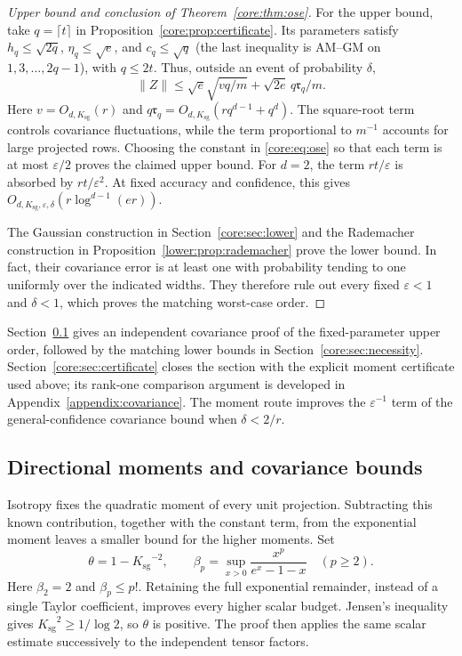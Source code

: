 \documentclass[11pt,a4paper]{article}
\theoremstyle{definition}\newtheorem{definition}[theorem]{Definition}
\theoremstyle{remark}\newtheorem{remark}[theorem]{Remark}
\numberwithin{equation}{section}
\newcommand{\Ksg}{{K_{\mathrm{sg}}}}\newcommand{\Cfour}{{C_4}}
\newcommand{\Rmom}{\mathfrak r}
\newcommand{\norm}[1]{\lVert#1\rVert}\newcommand{\ip}[2]{\langle#1,#2\rangle}
\begin{document}
\begin{proof}[Upper bound and conclusion of Theorem~\ref{core:thm:ose}]
For the upper bound, take $q=\lceil t\rceil$ in
Proposition~\ref{core:prop:certificate}. Its parameters satisfy
$h_q\le\sqrt{2q}$, $\eta_q\le\sqrt e$, and $c_q\le\sqrt q$
(the last inequality is AM--GM on $1,3,\ldots,2q-1$), with $q\le2t$.
Thus, outside an event of probability $\delta$,
\[
 \norm Z\le\sqrt e\sqrt{vq/m}+\sqrt{2e}\,q\Rmom_q/m.
\]
Here $v=O_{d,\Ksg}(r)$ and
$q\Rmom_q=O_{d,\Ksg}(rq^{d-1}+q^d)$.
The square-root term controls covariance fluctuations, while the term
proportional to $m^{-1}$ accounts for large projected rows.
Choosing the constant in \eqref{core:eq:ose} so that each term is at
most $\varepsilon/2$ proves the claimed upper bound. For $d=2$, the
term $rt/\varepsilon$ is absorbed by $rt/\varepsilon^2$.
At fixed accuracy and confidence, this gives
$O_{d,\Ksg,\varepsilon,\delta}(r\log^{d-1}(er))$.

The Gaussian construction in Section~\ref{core:sec:lower} and the
Rademacher construction in Proposition~\ref{lower:prop:rademacher}
prove the lower bound. In fact, their covariance error is at least one
with probability tending to one uniformly over the indicated widths.
They therefore rule out every fixed $\varepsilon<1$ and $\delta<1$,
which proves the matching worst-case order.
\end{proof}

Section~\ref{core:sec:local} gives an independent covariance proof of
the fixed-parameter upper order, followed by the matching lower bounds
in Section~\ref{core:sec:necessity}. Section~\ref{core:sec:certificate}
closes the section with the explicit moment certificate used above;
its rank-one comparison argument is developed in
Appendix~\ref{appendix:covariance}.
The moment route improves the $\varepsilon^{-1}$ term of the
general-confidence covariance bound when $\delta<2/r$.

\subsection{Directional moments and covariance bounds}
\label{core:sec:local}

Isotropy fixes the quadratic moment of every unit projection.
Subtracting this known contribution, together with the constant term,
from the exponential moment leaves a smaller bound for the higher
moments. Set
\begin{equation}\label{core:eq:notation}
 \theta=1-\Ksg^{-2},\qquad
 \beta_p=\sup_{x>0}\frac{x^p}{e^x-1-x}\quad(p\ge2).
\end{equation}
Here $\beta_2=2$ and $\beta_p\le p!$. Retaining the full exponential
remainder, instead of a single Taylor coefficient, improves every higher
scalar budget. Jensen's inequality gives
$\Ksg^2\ge1/\log2$, so $\theta$ is positive. The proof then applies the
same scalar estimate successively to the independent tensor factors.
\end{document}
